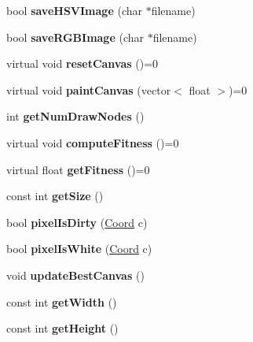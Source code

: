 \begin{DoxyCompactItemize}
bool {\bfseries save\+H\+S\+V\+Image} (char $\ast$filename)
\item 
\hypertarget{classCanvas_a0cd8a0f0e6a1b8bae854d93277926951}{}\label{classCanvas_a0cd8a0f0e6a1b8bae854d93277926951} 
bool {\bfseries save\+R\+G\+B\+Image} (char $\ast$filename)
\item 
\hypertarget{classCanvas_abd119da0a1dc1b24a45c8c45bd398732}{}\label{classCanvas_abd119da0a1dc1b24a45c8c45bd398732} 
virtual void {\bfseries reset\+Canvas} ()=0
\item 
\hypertarget{classCanvas_aa5c92419e72221fd67fae506419ec165}{}\label{classCanvas_aa5c92419e72221fd67fae506419ec165} 
virtual void {\bfseries paint\+Canvas} (vector$<$ float $>$)=0
\item 
\hypertarget{classCanvas_a23c0eb700982cfb7e8f468b51aa7adde}{}\label{classCanvas_a23c0eb700982cfb7e8f468b51aa7adde} 
int {\bfseries get\+Num\+Draw\+Nodes} ()
\item 
\hypertarget{classCanvas_a9a96d277519345b76e27349ca8d6421d}{}\label{classCanvas_a9a96d277519345b76e27349ca8d6421d} 
virtual void {\bfseries compute\+Fitness} ()=0
\item 
\hypertarget{classCanvas_a21fb2ed04cb521a5cdb3516bfa7bf6f1}{}\label{classCanvas_a21fb2ed04cb521a5cdb3516bfa7bf6f1} 
virtual float {\bfseries get\+Fitness} ()=0
\item 
\hypertarget{classCanvas_af78dc240a3278b5d7abad1cd743e31c4}{}\label{classCanvas_af78dc240a3278b5d7abad1cd743e31c4} 
const int {\bfseries get\+Size} ()
\item 
\hypertarget{classCanvas_a32c661c9bf432d32b6b75d097cba614f}{}\label{classCanvas_a32c661c9bf432d32b6b75d097cba614f} 
bool {\bfseries pixel\+Is\+Dirty} (\hyperlink{structCoord}{Coord} c)
\item 
\hypertarget{classCanvas_aff7ccbf887a62cfaf2785845d5dabb17}{}\label{classCanvas_aff7ccbf887a62cfaf2785845d5dabb17} 
bool {\bfseries pixel\+Is\+White} (\hyperlink{structCoord}{Coord} c)
\item 
\hypertarget{classCanvas_ac2032301cc13268992ecf3df85b73de0}{}\label{classCanvas_ac2032301cc13268992ecf3df85b73de0} 
void {\bfseries update\+Best\+Canvas} ()
\item 
\hypertarget{classCanvas_a36f33f02cee811e0d5a13e659eeb1f73}{}\label{classCanvas_a36f33f02cee811e0d5a13e659eeb1f73} 
const int {\bfseries get\+Width} ()
\item 
\hypertarget{classCanvas_a0b94a41db3014f125219155940437505}{}\label{classCanvas_a0b94a41db3014f125219155940437505} 
const int {\bfseries get\+Height} ()
\end{DoxyCompactItemize}
